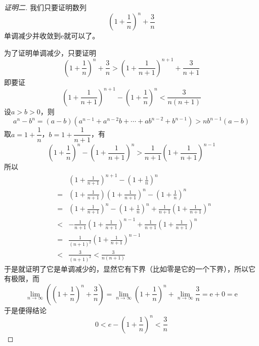 \begin{proof}[证明二]
  我们只要证明数列
  \[ \left( 1 + \frac{1}{n} \right)^n + \frac{3}{n} \]
  单调减少并收敛到$\mathrm{e}$就可以了。

  为了证明单调减少，只要证明
  \[ \left( 1 + \frac{1}{n} \right)^n + \frac{3}{n} > \left( 1 + \frac{1}{n+1} \right)^{n+1} + \frac{3}{n+1} \]
  即要证
  \[ \left( 1 + \frac{1}{n+1} \right)^{n+1} - \left( 1 + \frac{1}{n} \right)^n < \frac{3}{n(n+1)} \]
  设$a>b>0$，则
  \[ a^n-b^n=(a-b)(a^{n-1}+a^{n-2}b+\cdots+ab^{n-2}+b^{n-1})>nb^{n-1}(a-b) \]
  取$a=1+\dfrac{1}{n}$，$b=1+\dfrac{1}{n+1}$，有
  \[ \left( 1 + \frac{1}{n} \right)^{n} - \left( 1 + \frac{1}{n+1} \right)^{n} >\frac{1}{n+1}\left( 1+\frac{1}{n+1} \right)^{n-1} \]
  所以
  \begin{eqnarray*}
    && \left( 1 + \frac{1}{n+1} \right)^{n+1} - \left( 1 + \frac{1}{n} \right)^n \\
    & = & \left( 1 + \frac{1}{n+1} \right)\left( 1 + \frac{1}{n+1} \right)^{n} - \left( 1 + \frac{1}{n} \right)^n \\
    & = & \left( 1 + \frac{1}{n+1} \right)^{n} - \left( 1 + \frac{1}{n} \right)^n + \frac{1}{n+1} \left( 1 + \frac{1}{n+1} \right)^{n} \\
    & < & -\frac{1}{n+1}\left( 1+\frac{1}{n+1} \right)^{n-1} + \frac{1}{n+1} \left( 1 + \frac{1}{n+1} \right)^{n} \\
    & = & \frac{1}{(n+1)^2}\left( 1+\frac{1}{n+1} \right)^{n-1} \\
    & < & \frac{3}{(n+1)^2} < \frac{3}{n(n+1)}
  \end{eqnarray*}
  于是就证明了它是单调减少的，显然它有下界（比如零是它的一个下界），所以它有极限，而
  \[ \lim_{n \to \infty} \left( \left(1+\frac{1}{n} \right)^n + \frac{3}{n} \right) = \lim_{n \to \infty}\left( 1+\frac{1}{n} \right)^n + \lim_{n \to \infty} \frac{3}{n} = \mathrm{e} + 0 = \mathrm{e} \]
    于是便得结论
\[ 0 < e-\left( 1 + \frac{1}{n} \right)^n < \frac{3}{n} \]
\end{proof}

